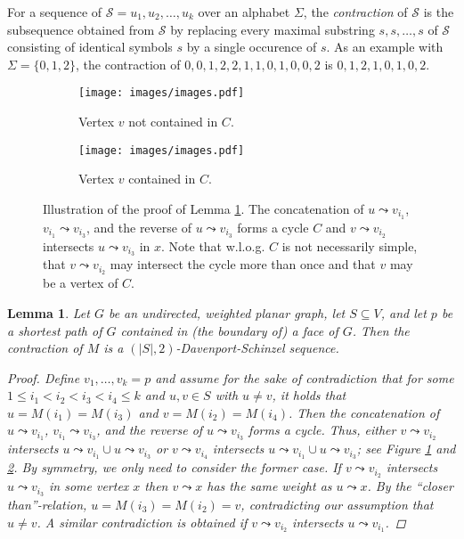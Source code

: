 \documentclass[a4paper,UKenglish,cleveref, autoref, thm-restate]{article}
\newtheorem{lemma}{Lemma}
\begin{document}
For a sequence of $\mathcal S = u_1,u_2,\ldots,u_k$ over an alphabet $\Sigma$, the \emph{contraction} of $\mathcal S$ is the subsequence obtained from $\mathcal S$ by replacing every maximal substring $s,s,\ldots, s$ of $\mathcal S$ consisting of identical symbols $s$ by a single occurence of $s$. As an example with $\Sigma = \{0,1,2\}$, the contraction of $ 0,0,1,2,2,1,1,0,1,0,0,2$ is $0,1,2,1,0,1,0,2$.

\begin{figure}
\centering
\begin{subfigure}{.45\textwidth}
  \centering
  \texttt{[image: images/images.pdf]}
  \caption{Vertex $v$ not contained in $C$.}
  \label{fig:dp-cases1}
\end{subfigure}%
\begin{subfigure}{.45\textwidth}
  \centering
  \texttt{[image: images/images.pdf]}
  \caption{Vertex $v$ contained in $C$.}
  \label{fig:dp-cases2}
\end{subfigure}
\caption{Illustration of the proof of Lemma \ref{lem:alternation}. The concatenation of $u \leadsto v_{i_1}$, $v_{i_1}\leadsto v_{i_3}$, and the reverse of $u\leadsto v_{i_3}$ forms a cycle $C$ and $v \leadsto v_{i_2}$ intersects $u \leadsto v_{i_3}$ in $x$. Note that w.l.o.g. $C$ is not necessarily simple, that $v \leadsto v_{i_2}$ may intersect the cycle more than once and that $v$ may be a vertex of $C$.}
\label{fig:dp-cases}
\end{figure}

\begin{lemma}\label{lem:alternation}
Let $G$ be an undirected, weighted planar graph, let $S \subseteq V$, and let $p$ be a shortest path of $G$ contained in (the boundary of) a face of $G$. Then the contraction of $M$ is a  $(|S|,2)$-Davenport-Schinzel sequence.
\begin{proof}
Define $v_1, \hdots, v_k = p$ and assume for the sake of contradiction that for some $1 \leq i_1 < i_2 < i_3 < i_4 \leq k$ and $u,v \in S$ with $u\neq v$, it holds that $u = M(i_1) = M(i_3)$ and $v = M(i_2) = M(i_4)$.  Then the concatenation of $u \leadsto v_{i_1}$, $v_{i_1}\leadsto v_{i_3}$, and the reverse of $u\leadsto v_{i_3}$ forms a cycle. Thus, either $v\leadsto v_{i_2}$ intersects $u\leadsto v_{i_1}\cup u\leadsto v_{i_3}$ or $v\leadsto v_{i_4}$ intersects $u\leadsto v_{i_1}\cup u\leadsto v_{i_3}$; see Figure \ref{fig:dp-cases1} and \ref{fig:dp-cases2}. By symmetry, we only need to consider the former case. If $v\leadsto v_{i_2}$ intersects $u\leadsto v_{i_3}$ in some vertex $x$ then $v\leadsto x$ has the same weight as $u\leadsto x$. By the ``closer than''-relation, $u = M(i_3) = M(i_2) = v$, contradicting our assumption that $u\neq v$. A similar contradiction is obtained if $v\leadsto v_{i_2}$ intersects $u\leadsto v_{i_1}$.
\end{proof}
\end{lemma}
\end{document}
